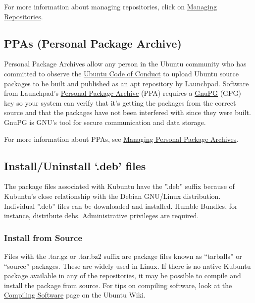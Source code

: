 \documentclass[letterpaper,10pt,english]{sphinxmanual}
\begin{document}
For more information about managing repositories, click on \href{https://help.ubuntu.com/community/Repositories}{Managing Repositories}.


\subsection{PPAs (Personal Package Archive)}
\label{\detokenize{docs/advanced:ppas-personal-package-archive}}
Personal Package Archives allow any person in the Ubuntu community who has committed to observe the \href{https://launchpad.net/codeofconduct}{Ubuntu Code of Conduct} to upload Ubuntu source packages to be built and published as an apt repository by Launchpad. Software from Launchpad's \href{https://launchpad.net/ubuntu/+ppas}{Personal Package Archive} (PPA) requires a \href{https://www.gnupg.org/}{GnuPG} (GPG) key so your system can verify that it's getting the packages from the correct source and that the packages have not been interfered with since they were built. GnuPG is GNU's tool for secure communication and data storage.

For more information about PPAs, see \href{https://userbase.kde.org/Kubuntu/Advanced/Repositories\#Managing\_Personal\_Package\_Archives}{Managing Personal Package Archives}.


\subsection{Install/Uninstall `.deb' files}
\label{\detokenize{docs/advanced:install-uninstall-deb-files}}
The package files associated with Kubuntu have the ''.deb'' suffix because of Kubuntu's close relationship with the Debian GNU/Linux distribution. Individual ''.deb'' files can be downloaded and installed. Humble Bundles, for instance, distribute debs. Administrative privileges are required.


\subsubsection{Install from Source}
\label{\detokenize{docs/advanced:install-from-source}}
Files with the .tar.gz or .tar.bz2 suffix are package files known as ``tarballs'' or ``source'' packages. These are widely used in Linux. If there is no native Kubuntu package available in any of the repositories, it may be possible to compile and install the package from source. For tips on compiling software, look at the \href{https://help.ubuntu.com/community/CompilingSoftware}{Compiling Software} page on the Ubuntu Wiki.
\end{document}
